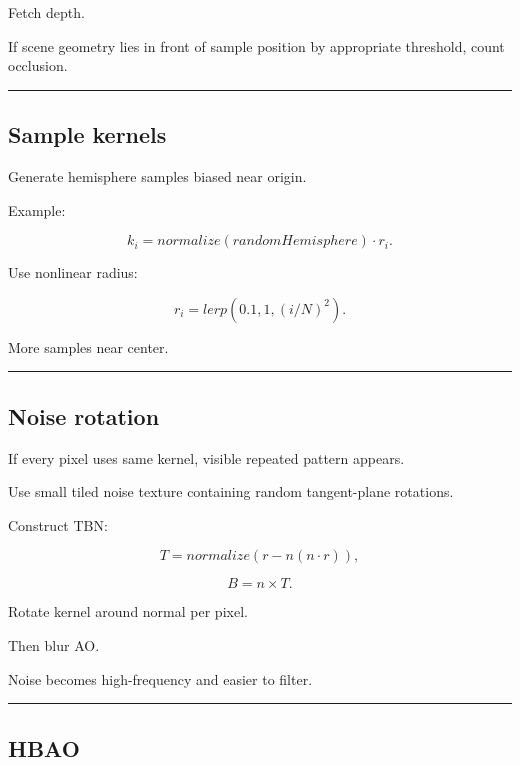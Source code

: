 Fetch depth.

If scene geometry lies in front of sample position by appropriate threshold, count occlusion.

\begin{center}\rule{0.5\linewidth}{0.5pt}\end{center}

\subsection{Sample kernels}\label{04-visual-computing-ii-ch040-sample-kernels}

\hypertarget{04-visual-computing-ii-ch040-sample-kernels}{}

Generate hemisphere samples biased near origin.

Example:

\[
k_i=
normalize(randomHemisphere)
\cdot r_i.
\]

Use nonlinear radius:

\[
r_i=
lerp(
0.1,
1,
(i/N)^2
).
\]

More samples near center.

\begin{center}\rule{0.5\linewidth}{0.5pt}\end{center}

\subsection{Noise rotation}\label{04-visual-computing-ii-ch040-noise-rotation}

\hypertarget{04-visual-computing-ii-ch040-noise-rotation}{}

If every pixel uses same kernel, visible repeated pattern appears.

Use small tiled noise texture containing random tangent-plane rotations.

Construct TBN:

\[
T=
normalize(
r-n(n\cdot r)
),
\]

\[
B=n\times T.
\]

Rotate kernel around normal per pixel.

Then blur AO.

Noise becomes high-frequency and easier to filter.

\begin{center}\rule{0.5\linewidth}{0.5pt}\end{center}

\subsection{HBAO}\label{04-visual-computing-ii-ch040-hbao}

